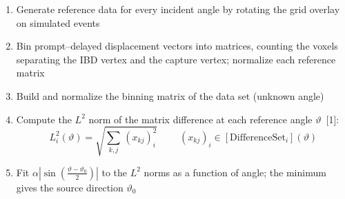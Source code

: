 \begin{enumerate}
    \item Generate reference data for every incident angle by rotating the
          grid overlay on simulated events
    \item Bin prompt--delayed displacement vectors into matrices, counting
          the voxels separating the IBD vertex and the capture vertex;
          normalize each reference matrix
    \item Build and normalize the binning matrix of the data set
          (unknown angle)
    \item Compute the \(L^2\) norm of the matrix difference at each
          reference angle \(\vartheta\)~[1]:
    \begin{equation}
      \boxed{\;L^2_i(\vartheta) = \sqrt{\sum_{k,j}\,(x_{kj})_i^2}\;}
      \qquad (x_{kj})_i \in [\mathrm{DifferenceSet}_i](\vartheta)
      \label{eq:l2norm}
    \end{equation}
    \item Fit \(\alpha\left|\sin\left(\frac{\vartheta-\vartheta_0}{2}\right)\right|\)
          to the \(L^2\) norms as a function of angle; the minimum gives the
          source direction \(\vartheta_0\)
\end{enumerate}

\vfill

